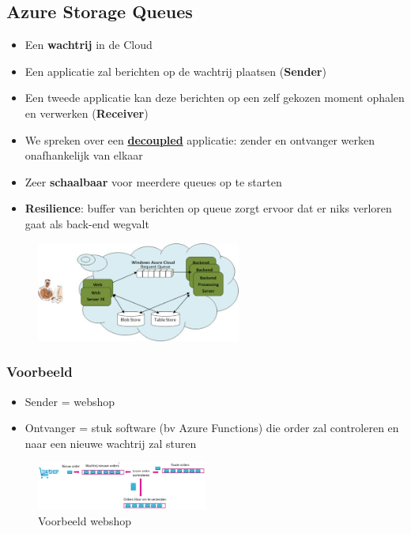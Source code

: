 \documentclass{article}
\newcommand{\bold}[1]{\textbf{#1}}
\begin{document}
\subsection{Azure Storage Queues}

\begin{itemize}
    \item Een \bold{wachtrij} in de Cloud
    \item Een applicatie zal berichten op de wachtrij plaatsen (\bold{Sender})
    \item Een tweede applicatie kan deze berichten op een zelf gekozen moment ophalen en verwerken (\bold{Receiver})
    \item We spreken over een \bold{\underline{decoupled}} applicatie: zender en ontvanger werken onafhankelijk van elkaar
    \item Zeer \bold{schaalbaar} voor meerdere queues op te starten
    \item \bold{Resilience}: buffer van berichten op queue zorgt ervoor dat er niks verloren gaat als back-end wegvalt
\end{itemize}

\begin{figure}[H]
    \centering
    \includegraphics[width=0.6\textwidth]{azure-storage-queues.png}
    \caption{}
\end{figure}


\subsubsection{Voorbeeld}

\begin{itemize}
    \item Sender = webshop
    \item Ontvanger = stuk software (bv Azure Functions) die order zal controleren en naar een nieuwe wachtrij zal sturen
\end{itemize}

\begin{figure}[H]
    \centering
    \includegraphics[width=0.5\textwidth]{azure-storage-queues-voorbeeld.png}
    \caption{Voorbeeld webshop}
\end{figure}
\end{document}

